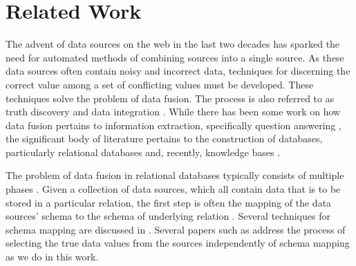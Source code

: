\documentclass{acm_proc_article-sp}
\begin{document}
\maketitle








\section{Related Work}
The advent of data sources on the web in the last two decades has sparked the need for automated methods of combining sources into a single source. As these data sources often contain noisy and incorrect data, techniques for discerning the correct value among a set of conflicting values must be developed. These techniques solve the problem of data fusion. The process is also referred to as truth discovery \cite{waguih:truth} \cite{yin:truth} and data integration \cite{sarma:data} \cite{zhao:bayesian}. While there has been some work on how data fusion pertains to information extraction, specifically question answering \cite{wu:corroborating}, the significant body of literature pertains to the construction of databases, particularly relational databases and, recently, knowledge bases \cite{dong:data}. 



The problem of data fusion in relational databases typically consists of multiple phases \cite{bleiholder:data} \cite{li:truth}. Given a collection of data sources, which all contain data that is to be stored in a particular relation, the first step is often the mapping of the data sources' schema to the schema of underlying relation \cite{bleiholder:data}. Several techniques for schema mapping are discussed in \cite{naumann:data}. Several papers such as \cite{li:truth} address the process of selecting the true data values from the sources independently of schema mapping as we do in this work.
\end{document}
